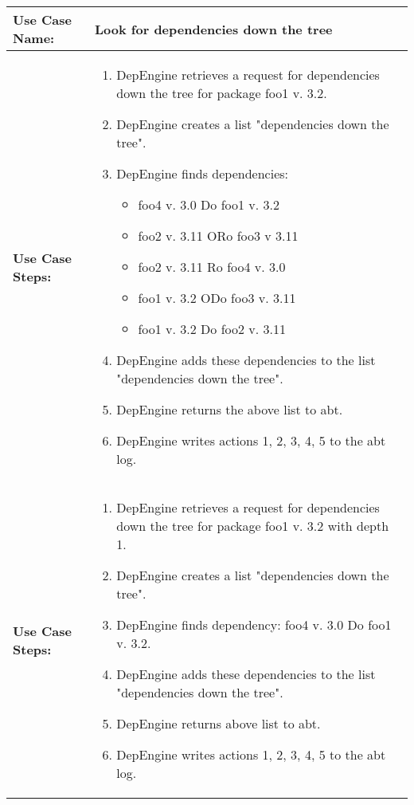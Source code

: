 
\begin{tabularx}{\linewidth}{|l|X|}
\hline
\textbf{Use Case Name:} & \textbf{Look for dependencies down the tree} \\
\hline
\textbf{Use Case Steps:} & 
\begin{minipage}{\linewidth} 
 \vspace{0.05em}
  \begin{enumerate}
   \item DepEngine retrieves a request for dependencies down the tree for package foo1 v. 3.2.
   \item DepEngine creates a list "dependencies down the tree".
   \item DepEngine finds dependencies:
   \begin{itemize}
    \item foo4 v. 3.0 Do foo1 v. 3.2
    \item foo2 v. 3.11 ORo foo3 v 3.11
    \item foo2 v. 3.11 Ro foo4 v. 3.0
    \item foo1 v. 3.2 ODo foo3 v. 3.11
    \item foo1 v. 3.2 Do foo2 v. 3.11
   \end{itemize}
   \item DepEngine adds these dependencies to the list "dependencies down the tree".
   \item DepEngine returns the above list to abt.
   \item DepEngine writes actions 1, 2, 3, 4, 5 to the abt log.
  \end{enumerate}
 \vspace{0.05em}
\end{minipage}
\\
\hline 
\textbf{Use Case Steps:} & 
\begin{minipage}{\linewidth} 
 \vspace{0.05em}
  \begin{enumerate}
   \item DepEngine retrieves a request for dependencies down the tree for package foo1 v. 3.2 with depth 1. 
   \item DepEngine creates a list "dependencies down the tree".
   \item DepEngine finds dependency: foo4 v. 3.0 Do foo1 v. 3.2.
   \item DepEngine adds these dependencies to the list "dependencies down the tree".
   \item DepEngine returns above list to abt.
   \item DepEngine writes actions 1, 2, 3, 4, 5 to the abt log.
  \end{enumerate}
 \vspace{0.05em}
\end{minipage}
\\
\hline 
\end{tabularx}
